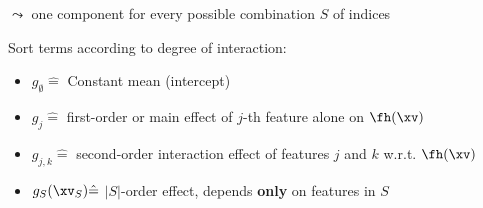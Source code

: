 \documentclass[11pt,compress,t,notes=noshow, aspectratio=169, xcolor=table]{beamer}
\newcommand{\open}{}
\newcommand{\close}{}
\begin{document}
\begin{frame}
\begin{definition}
$\leadsto$ one component for every possible combination $S$ of indices
\end{definition}
Sort terms according to degree of interaction:
\begin{itemize}
\item $g_{\open \emptyset \close} \hat = $ Constant mean (intercept) %
\item $g_{\open j \close} \hat = $ first-order or main effect of $j$-th feature alone on $\fh(\xv)$
\item $g_{\open j, k \close} \hat = $ second-order interaction effect of features $j$ and $k$ w.r.t. $\fh(\xv)$%
\item $g_{S}(\xv_S) \hat = $ $|S|$-order effect, depends \textbf{only} on features in $S$ %
\end{itemize}
\lz
\end{frame}




\end{document}
